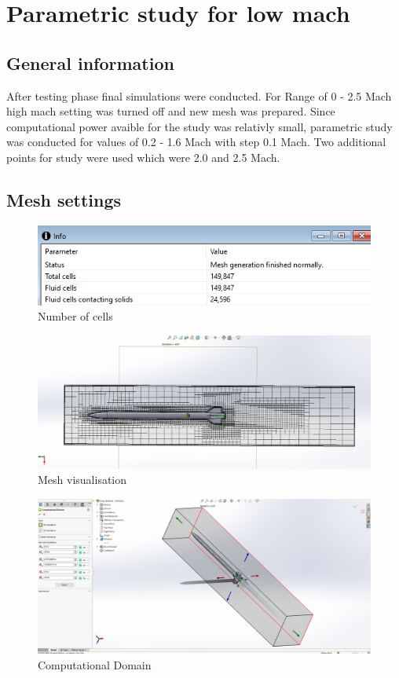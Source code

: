 \documentclass{article}
\begin{document}
\section{Parametric study for low mach}
\subsection{General information}
After testing phase final simulations were conducted. For Range of 0 - 2.5 Mach high mach setting was turned off and new mesh was prepared. Since computational power avaible for the study was relativly small, parametric study was conducted for values of 0.2 - 1.6 Mach with step 0.1 Mach. Two additional points for study were used which were 2.0 and 2.5 Mach.

\subsection{Mesh settings}

\begin{figure}[H]
\centering
\includegraphics[width=\textwidth]{MESHCELLS}
\caption{Number of cells}
\label{fig:MESHCELLS}
\end{figure}

\begin{figure}[H]
\centering
\includegraphics[width=\textwidth]{FinalMESH}
\caption{Mesh visualisation}
\label{fig:FinalMESH}
\end{figure}

\begin{figure}[H]
    \centering
    \includegraphics[width=\textwidth]{Final50Domain}
    \caption{Computational Domain}
    \label{fig:Final50Domain}
    \end{figure}
\end{document}
